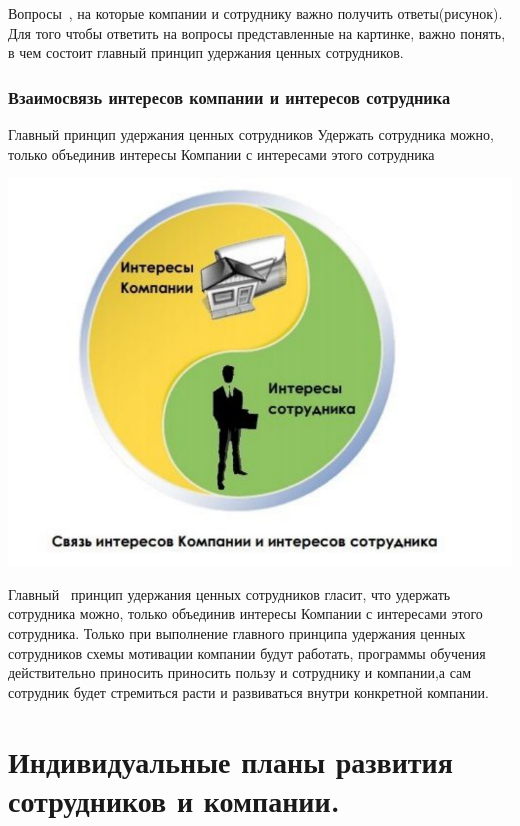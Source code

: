 \documentclass{../industrial-development}
\begin{document}
{\lecturenotes
Вопросы~\cite{IPl}, на которые компании и сотруднику важно получить ответы(рисунок).
Для того чтобы ответить на вопросы представленные на картинке, важно понять, в чем состоит главный принцип удержания ценных сотрудников.


\begin{frame} \frametitle{Взаимосвязь интересов компании и интересов сотрудника}
  \begin{block}{Главный принцип удержания ценных сотрудников}
Удержать сотрудника можно, только объединив интересы Компании с интересами этого сотрудника
  \end{block}
  \centerline{\includegraphics[height=0.58\textheight]{11-IT-specialist's-way/inter.pdf}}
\end{frame}

\lecturenotes
Главный~\cite{IPl} принцип удержания ценных сотрудников гласит, что удержать сотрудника можно, только объединив интересы Компании с интересами этого сотрудника.
Только при выполнение главного принципа удержания ценных сотрудников схемы мотивации компании будут работать, программы обучения действительно приносить приносить пользу и сотруднику и компании,а сам сотрудник будет стремиться расти и развиваться внутри конкретной компании.



\section{Индивидуальные планы развития сотрудников и компании. }

}
\end{document}
